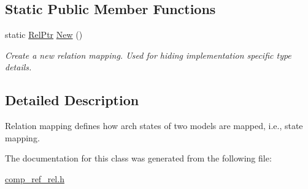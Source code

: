 \subsection*{Static Public Member Functions}
\begin{DoxyCompactItemize}
\item 
\mbox{\label{classilang_1_1_relation_map_ab7a34fdd473ed3d0feede350dca4b95e}} 
static \mbox{\hyperlink{classilang_1_1_relation_map_adfdefb173e77fc29073c233aa3ccdbd2}{Rel\+Ptr}} \mbox{\hyperlink{classilang_1_1_relation_map_ab7a34fdd473ed3d0feede350dca4b95e}{New}} ()
\begin{DoxyCompactList}\small\item\em Create a new relation mapping. Used for hiding implementation specific type details. \end{DoxyCompactList}\end{DoxyCompactItemize}


\subsection{Detailed Description}
Relation mapping defines how arch states of two models are mapped, i.\+e., state mapping. 

The documentation for this class was generated from the following file\+:\begin{DoxyCompactItemize}
\item 
\mbox{\hyperlink{comp__ref__rel_8h}{comp\+\_\+ref\+\_\+rel.\+h}}\end{DoxyCompactItemize}
